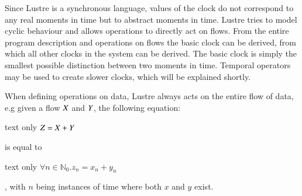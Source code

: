 Since Lustre is a synchronous language, values of the clock do not correspond to any real moments in time but to abstract moments in time. 
Lustre tries to model cyclic behaviour and allows operations to directly act on flows.
From the entire program description and operations on flows the basic clock can be derived, from which all other clocks in the system can be derived. 
The basic clock is simply the smallest possible distinction between two moments in time. 
Temporal operators may be used to create slower clocks, which will be explained shortly.

When defining operations on data, Lustre always acts on the entire flow of data, e.g given a flow \ensuremath{\Conid{X}} and \ensuremath{\Conid{Y}}, the following equation:\\

\begin{changemargin}{1cm}{0cm}
\begin{expansionno}{text only}
\ensuremath{\Conid{Z}\mathrel{=}\Conid{X}\mathbin{+}\Conid{Y}}
\end{expansionno}
\end{changemargin}

is equal to\\
\begin{changemargin}{1cm}{0cm}
\begin{expansionno}{text only}
$\forall n \in \mathbb{N}_0. z_n = x_n + y_n$
\end{expansionno}
\end{changemargin}
, with $n$ being instances of time where both $x$ and $y$ exist. 

